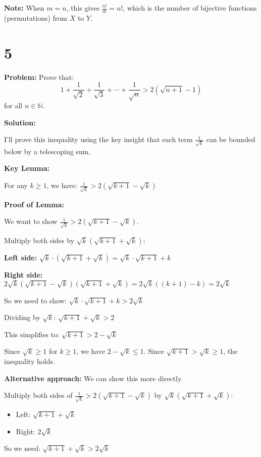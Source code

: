 \documentclass[12pt,a4paper]{article}
\theoremstyle{definition}
\theoremstyle{remark}
\begin{document}
\textbf{Note:} When $m = n$, this gives $\frac{n!}{0!} = n!$, which is the number of bijective functions (permutations) from $X$ to $Y$.


\section*{5}

\textbf{Problem:} Prove that:
$$1 + \frac{1}{\sqrt{2}} + \frac{1}{\sqrt{3}} + \cdots + \frac{1}{\sqrt{n}} > 2(\sqrt{n+1} - 1)$$
for all $n \in \mathbb{N}$.

\textbf{Solution:}

I'll prove this inequality using the key insight that each term $\frac{1}{\sqrt{k}}$ can be bounded below by a telescoping sum.

\textbf{Key Lemma:}

For any $k \geq 1$, we have: $\frac{1}{\sqrt{k}} > 2(\sqrt{k+1} - \sqrt{k})$

\textbf{Proof of Lemma:}

We want to show $\frac{1}{\sqrt{k}} > 2(\sqrt{k+1} - \sqrt{k})$.

Multiply both sides by $\sqrt{k}(\sqrt{k+1} + \sqrt{k})$:

\textbf{Left side:} $\sqrt{k} \cdot (\sqrt{k+1} + \sqrt{k}) = \sqrt{k} \cdot \sqrt{k+1} + k$

\textbf{Right side:} $2\sqrt{k}(\sqrt{k+1} - \sqrt{k})(\sqrt{k+1} + \sqrt{k}) = 2\sqrt{k}((k+1) - k) = 2\sqrt{k}$

So we need to show: $\sqrt{k} \cdot \sqrt{k+1} + k > 2\sqrt{k}$

Dividing by $\sqrt{k}$: $\sqrt{k+1} + \sqrt{k} > 2$

This simplifies to: $\sqrt{k+1} > 2 - \sqrt{k}$

Since $\sqrt{k} \geq 1$ for $k \geq 1$, we have $2 - \sqrt{k} \leq 1$.
Since $\sqrt{k+1} > \sqrt{k} \geq 1$, the inequality holds.

\textbf{Alternative approach:} We can show this more directly.

Multiply both sides of $\frac{1}{\sqrt{k}} > 2(\sqrt{k+1} - \sqrt{k})$ by $\sqrt{k}(\sqrt{k+1} + \sqrt{k})$:

\begin{itemize}
\item Left: $\sqrt{k+1} + \sqrt{k}$
\item Right: $2\sqrt{k}$
\end{itemize}

So we need: $\sqrt{k+1} + \sqrt{k} > 2\sqrt{k}$
\end{document}
